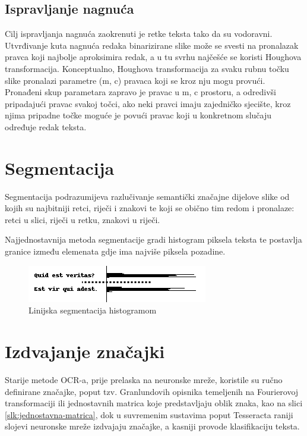 \documentclass[zavrsnirad]{fer}
\begin{document}
\subsection{Ispravljanje nagnuća}

Cilj ispravljanja nagnuća zaokrenuti je retke teksta tako da su vodoravni. Utvrđivanje kuta nagnuća redaka binarizirane slike može se svesti na pronalazak pravca koji najbolje aproksimira redak, a u tu svrhu najčešće se koristi Houghova transformacija. \cite{Hassanein2015} Konceptualno, Houghova transformacija za svaku rubnu točku slike pronalazi parametre (m, c) pravaca koji se kroz nju mogu provući. Pronađeni skup parametara zapravo je pravac u m, c prostoru, a odredivši pripadajući pravac svakoj točci, ako neki pravci imaju zajedničko sjecište, kroz njima pripadne točke moguće je povući pravac koji u konkretnom slučaju određuje redak teksta.

\section{Segmentacija}

Segmentacija podrazumijeva razlučivanje semantički značajne dijelove slike od kojih su najbitniji retci, riječi i znakovi te koji se obično tim redom i pronalaze: retci u slici, riječi u retku, znakovi u riječi.

Najjednostavnija metoda segmentacije gradi histogram piksela teksta te postavlja granice između elemenata gdje ima najviše piksela pozadine.

\begin{figure}[hbt]
	\centering
	\includegraphics[width=0.9\linewidth]{Figures/line-segmentation.png} 
	\caption{Linijska segmentacija histogramom}
	\label{slk:histogram}
\end{figure}

\section{Izdvajanje značajki}

Starije metode OCR-a, prije prelaska na neuronske mreže, koristile su ručno definirane značajke, poput tzv. Granlundovih opisnika temeljenih na Fourierovoj transformaciji \cite{Trier1996} ili jednostavnih matrica koje predstavljaju oblik znaka, kao na slici \ref{slk:jednostavna-matrica},  dok u suvremenim sustavima poput Tesseracta raniji slojevi neuronske mreže izdvajaju značajke, a kasniji provode klasifikaciju teksta.
\end{document}
